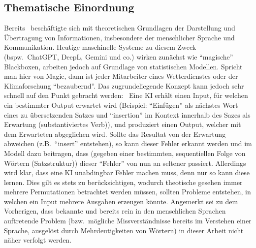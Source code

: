 \subsection{Thematische Einordnung}\label{einleitung:motivation}
Bereits~\cite{bellSystemTechnicalJournal:claudeShannon1948:mathematicalTheoryOfCommunication} beschäftigte sich mit theoretischen Grundlagen der Darstellung und Übertragung von Informationen, insbesondere der menschlicher Sprache und Kommunikation. Heutige maschinelle Systeme zu diesem Zweck (bspw.\ ChatGPT, DeepL, Gemini und co.) wirken zunächst wie \enquote{magische} Blackboxen, arbeiten jedoch auf Grundlage von statistischen Modellen. Spricht man hier von Magie, dann ist jeder Mitarbeiter eines Wetterdienstes oder der Klimaforschung \enquote{bezaubernd}. Das zugrundeliegende Konzept kann jedoch sehr schnell auf den Punkt gebracht werden:\ 
Eine KI erhält einen Input, für welchen ein bestimmter Output erwartet wird (Beispiel: \enquote{Einfügen} als nächstes Wort eines zu übersetzenden Satzes und \enquote{insertion} im Kontext innerhalb des Sazes als Erwartung (substantiviertes Verb)), und produziert einen Output, welcher mit dem Erwarteten abgeglichen wird. Sollte das Resultat von der Erwartung abweichen (z.B.\ \enquote{insert} entstehen), so kann dieser Fehler erkannt werden und im Modell dazu beitragen, dass (gegeben einer bestimmten, sequentiellen Folge von Wörtern (Satzstruktur)) dieser \enquote{Fehler} von nun an seltener passiert. Allerdings wird klar, dass eine KI unabdingbar Fehler machen muss, denn nur so kann diese lernen. Dies gilt es stets zu berücksichtigen, wodurch theotische gesehen immer mehrere Permutationen betrachtet werden müssen, sollten Probleme entstehen, in welchen ein Input mehrere Ausgaben erzeugen könnte. Angemerkt sei zu dem Vorherigen, dass bekannte und bereits rein in den menschlichen Sprachen auftretende Problem (bzw.\ mögliche Missverständnisse bereits im Verstehen einer Sprache, ausgelöst durch Mehrdeutigkeiten von Wörtern) in dieser Arbeit nicht näher verfolgt werden.



